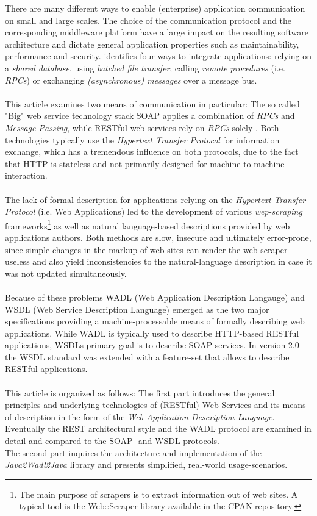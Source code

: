 There are many different ways to enable (enterprise) application communication on small and large scales. The choice of the communication protocol and the corresponding middleware platform have a large impact on the resulting software architecture and dictate general application properties such as maintainability, performance and security. \cite{BIGREST} identifies four ways to integrate applications: relying on a \emph{shared database}, using \emph{batched file transfer}, calling \emph{remote procedures} (i.e. \emph{RPCs}) or exchanging \emph{(asynchronous) messages} over a message bus.
\\ \\
This article examines two means of communication in particular: The so called "Big" web service technology stack SOAP applies a combination of \emph{RPCs} and \emph{Message Passing}, while RESTful web services rely on \emph{RPCs} solely \cite{WEBDSGN}. Both technologies typically use the \emph{Hypertext Transfer Protocol} for information exchange, which has a tremendous influence on both protocols, due to the fact that HTTP is stateless and not primarily designed for machine-to-machine interaction. 
\\ \\
The lack of formal description for applications relying on the \emph{Hypertext Transfer Protocol} (i.e. Web Applications) led to the development of various \emph{wep-scraping} frameworks\footnote{The main purpose of scrapers is to extract information out of web sites. A typical tool is the Web::Scraper library available in the CPAN repository.} as well as natural language-based descriptions provided by web applications authors. Both methods are slow, insecure and ultimately error-prone, since simple changes in the markup of web-sites can render the web-scraper useless and also yield inconsistencies to the natural-language description in case it was not updated simultaneously. \cite{WADLWSDL}
\\ \\
Because of these problems WADL (Web Application Description Langauge) and WSDL (Web Service Description Language) emerged as the two major specifications providing a machine-processable means of formally describing web applications. While WADL is typically used to describe HTTP-based RESTful applications, WSDLs primary goal is to describe SOAP services. In version 2.0 the WSDL standard was extended with a feature-set that allows to describe RESTful applications.
\\ \\
This article is organized as follows: The first part introduces the general principles and underlying technologies of (RESTful) Web Services and its means of description in the form of the \emph{Web Application Description Language}. Eventually the REST architectural style and the WADL protocol are examined in detail and compared to the SOAP- and WSDL-protocols.
\\
The second part inquires the architecture and implementation of the \emph{Java2Wadl2Java} library and presents simplified, real-world usage-scenarios.